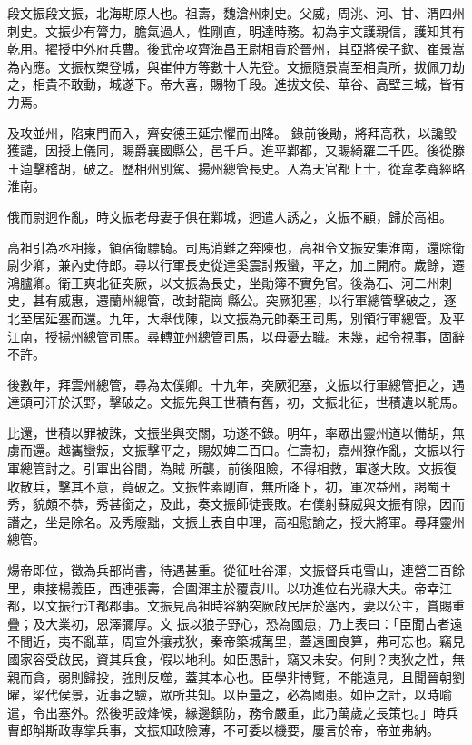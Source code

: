 \begin{pinyinscope}
 段文振段文振，北海期原人也。祖壽，魏滄州刺史。父威，周洮、河、甘、渭四州刺史。文振少有膂力，膽氣過人，性剛直，明達時務。初為宇文護親信，護知其有乾用。擢授中外府兵曹。後武帝攻齊海昌王尉相貴於晉州，其亞將侯子欽、崔景嵩為內應。文振杖槊登城，與崔仲方等數十人先登。文振隨景嵩至相貴所，拔佩刀劫之，相貴不敢動，城遂下。帝大喜，賜物千段。進拔文侯、華谷、高壁三城，皆有力焉。



 及攻並州，陷東門而入，齊安德王延宗懼而出降。
 錄前後勛，將拜高秩，以讒毀獲譴，因授上儀同，賜爵襄國縣公，邑千戶。進平鄴都，又賜綺羅二千匹。後從滕王逌擊稽胡，破之。歷相州別駕、揚州總管長史。入為天官都上士，從韋孝寬經略淮南。



 俄而尉迥作亂，時文振老母妻子俱在鄴城，迥遣人誘之，文振不顧，歸於高祖。



 高祖引為丞相掾，領宿衛驃騎。司馬消難之奔陳也，高祖令文振安集淮南，還除衛尉少卿，兼內史侍郎。尋以行軍長史從達奚震討叛蠻，平之，加上開府。歲餘，遷鴻臚卿。衛王爽北征突厥，以文振為長史，坐勛簿不實免官。後為石、河二州刺史，甚有威惠，遷蘭州總管，改封龍崗
 縣公。突厥犯塞，以行軍總管擊破之，逐北至居延塞而還。九年，大舉伐陳，以文振為元帥秦王司馬，別領行軍總管。及平江南，授揚州總管司馬。尋轉並州總管司馬，以母憂去職。未幾，起令視事，固辭不許。



 後數年，拜雲州總管，尋為太僕卿。十九年，突厥犯塞，文振以行軍總管拒之，遇達頭可汗於沃野，擊破之。文振先與王世積有舊，初，文振北征，世積遺以駝馬。



 比還，世積以罪被誅，文振坐與交關，功遂不錄。明年，率眾出靈州道以備胡，無虜而還。越巂蠻叛，文振擊平之，賜奴婢二百口。仁壽初，嘉州獠作亂，文振以行軍總管討之。引軍出谷間，為賊
 所襲，前後阻險，不得相救，軍遂大敗。文振復收散兵，擊其不意，竟破之。文振性素剛直，無所降下，初，軍次益州，謁蜀王秀，貌頗不恭，秀甚銜之，及此，奏文振師徒喪敗。右僕射蘇威與文振有隙，因而譖之，坐是除名。及秀廢黜，文振上表自申理，高祖慰諭之，授大將軍。尋拜靈州總管。



 煬帝即位，徵為兵部尚書，待遇甚重。從征吐谷渾，文振督兵屯雪山，連營三百餘里，東接楊義臣，西連張壽，合圍渾主於覆袁川。以功進位右光祿大夫。帝幸江都，以文振行江都郡事。文振見高祖時容納突厥啟民居於塞內，妻以公主，賞賜重疊；及大業初，恩澤彌厚。文
 振以狼子野心，恐為國患，乃上表曰：「臣聞古者遠不間近，夷不亂華，周宣外攘戎狄，秦帝築城萬里，蓋遠圖良算，弗可忘也。竊見國家容受啟民，資其兵食，假以地利。如臣愚計，竊又未安。何則？夷狄之性，無親而貪，弱則歸投，強則反噬，蓋其本心也。臣學非博覽，不能遠見，且聞晉朝劉曜，梁代侯景，近事之驗，眾所共知。以臣量之，必為國患。如臣之計，以時喻遣，令出塞外。然後明設烽候，緣邊鎮防，務令嚴重，此乃萬歲之長策也。」時兵曹郎斛斯政專掌兵事，文振知政險薄，不可委以機要，屢言於帝，帝並弗納。




\end{pinyinscope}
